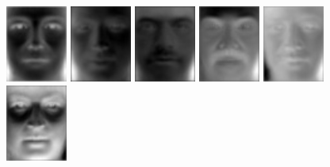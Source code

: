 \begin{figure}[hbt]
  \centering
  \includegraphics[width=0.18\textwidth]{../results/H_rez/eigenfaces/largest1.jpg}
  \includegraphics[width=0.18\textwidth]{../results/H_rez/eigenfaces/largest2.jpg}
  \includegraphics[width=0.18\textwidth]{../results/H_rez/eigenfaces/largest3.jpg}
  \includegraphics[width=0.18\textwidth]{../results/H_rez/eigenfaces/largest4.jpg}
  \includegraphics[width=0.18\textwidth]{../results/H_rez/eigenfaces/largest5.jpg} \\
  \vspace{4pt}
  \includegraphics[width=0.18\textwidth]{../results/H_rez/eigenfaces/largest6.jpg}

\end{figure}
